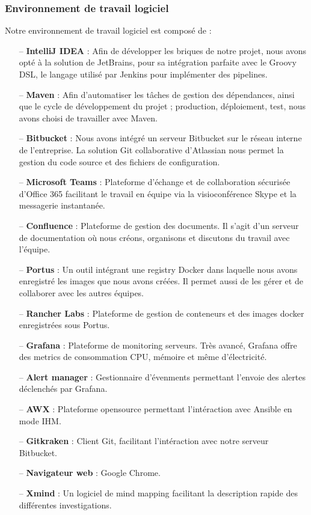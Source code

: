 \begin{spacing}{1.2}
\subsubsection{Environnement de travail logiciel}
Notre environnement de travail logiciel est composé de :
\begin{itemize}
    \setlength\itemsep{0em}
    \item[--] \textbf{IntelliJ IDEA} : Afin de développer les briques de notre projet, nous avons opté à la solution de JetBrains, pour sa intégration parfaite avec le Groovy DSL, le langage utilisé par Jenkins pour implémenter des pipelines. 
    \item[--] \textbf{Maven} : Afin d’automatiser les tâches de gestion des dépendances, ainsi que le cycle de développement du projet ; production, déploiement, test, nous avons choisi de travailler avec Maven. 
    \item[--] \textbf{Bitbucket} : Nous avons intégré un serveur Bitbucket sur le réseau interne de l’entreprise. La solution Git collaborative d'Atlassian nous permet la gestion du code source et des fichiers de configuration. 
    \item[--] \textbf{Microsoft Teams} : Plateforme d’échange et de collaboration sécurisée d'Office 365 facilitant le travail en équipe via la visioconférence Skype et la messagerie instantanée.
    \item[--] \textbf{Confluence} : Plateforme de gestion des documents. Il s’agit d’un serveur de documentation où nous créons, organisons et discutons du travail avec l’équipe.
    \item[--] \textbf{Portus} : Un outil intégrant une registry Docker dans laquelle nous avons enregistré les images que nous avons créées. Il permet aussi de les gérer et de collaborer avec les autres équipes.
    \item[--] \textbf{Rancher Labs} : Plateforme de gestion de conteneurs et des images docker enregistrées sous Portus.
    \item[--] \textbf{Grafana} : Plateforme de monitoring serveurs. Très avancé, Grafana offre des metrics de consommation CPU, mémoire et même d'électricité.
    \item[--] \textbf{Alert manager} : Gestionnaire d'évenments permettant l'envoie des alertes déclenchés par Grafana. 
    \item[--]\textbf{AWX} : Plateforme opensource permettant l'intéraction avec Ansible en mode IHM. 
    \item[--]\textbf{Gitkraken} : Client Git, facilitant l'intéraction avec notre serveur Bitbucket.
    \item[--] \textbf{Navigateur web} : Google Chrome.
    \item[--] \textbf{Xmind} : Un logiciel de mind mapping facilitant la description rapide des différentes investigations. 
\end{itemize}

\end{spacing}
